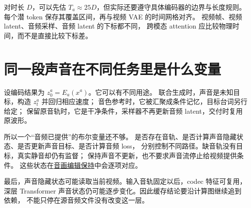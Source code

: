 对时长 $D$，可以先估 $T_a\approx25D$，但实际还要遵守具体编码器的边界与长度规则。
每个潜 token 保存其覆盖区间，再与视频 VAE 的时间网格对齐。
视频帧、视频 latent、音频采样、音频 latent 的下标都不同，
跨模态 attention 应比较物理时间，而不是直接比较下标差。

\section{同一段声音在不同任务里是什么变量}
设编码结果为 $z_0^a=E_a(x^a)$。它可以有不同用途。
联合生成时，声音是未知目标，构造 $z_t^a$ 并回归相应速度；
音色参考时，它被汇聚成条件记忆，目标台词另行给定；
保留原音轨时，它是干净条件，采样器不再更新音频 latent，交付时复用原波形。

所以一个“音频已提供”的布尔变量还不够。
是否存在音轨、是否计算声音隐藏状态、是否更新声音目标、是否计算音频 loss，
分别控制不同路径。缺音轨没有目标，真实静音却仍有监督；
保持声音不更新，也不要求声音流停止给视频提供条件。
这些状态在\hyperref[seedance-m23]{音画编辑保持}中会逐项对应。

最后，声音隐藏状态可能读取当前视频。输入音轨固定以后，codec 特征可复用，
深层 Transformer 声音状态仍可能逐步变化。因此缓存结论要沿计算图继续追到依赖，
不能只停在源音频文件没有改变这一层。
